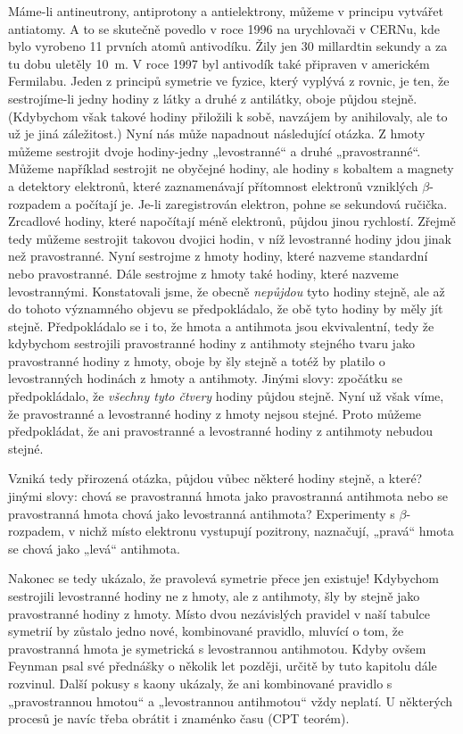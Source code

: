     Máme-li antineutrony, antiprotony a antielektrony, můžeme v principu vytvářet antiatomy.
    A to se skutečně povedlo v roce 1996 na urychlovači v CERNu, kde bylo vyrobeno 11 prvních atomů
    antivodíku. Žily jen 30 millardtin sekundy a za tu dobu uletěly \SI{10}{\m}. V roce 1997 byl
    antivodík také připraven v americkém Fermilabu. Jeden z principů symetrie ve fyzice, který
    vyplývá z rovnic, je ten, že sestrojíme-li jedny hodiny z látky a druhé z antilátky, oboje
    půjdou stejně. (Kdybychom však takové hodiny přiložili k sobě, navzájem by anihilovaly, ale to
    už je jiná záležitost.) Nyní nás může napadnout následující otázka. Z hmoty můžeme sestrojit
    dvoje hodiny-jedny „levostranné“ a druhé „pravostranné“. Můžeme například sestrojit ne obyčejné
    hodiny, ale hodiny s kobaltem a magnety a detektory elektronů, které zaznamenávají přítomnost
    elektronů vzniklých \(\beta\)-rozpadem a počítají je. Je-li zaregistrován elektron, pohne se
    sekundová ručička. Zrcadlové hodiny, které napočítají méně elektronů, půjdou jinou rychlostí.
    Zřejmě tedy můžeme sestrojit takovou dvojici hodin, v níž levostranné hodiny jdou jinak než
    pravostranné. Nyní sestrojme z hmoty hodiny, které nazveme standardní nebo pravostranné. Dále
    sestrojme z hmoty také hodiny, které nazveme levostrannými. Konstatovali jsme, že obecně
    \emph{nepůjdou} tyto hodiny stejně, ale až do tohoto významného objevu se předpokládalo, že obě
    tyto hodiny by měly jít stejně. Předpokládalo se i to, že hmota a antihmota jsou ekvivalentní,
    tedy že kdybychom sestrojili pravostranné hodiny z antihmoty stejného tvaru jako pravostranné
    hodiny z hmoty, oboje by šly stejně a totéž by platilo o levostranných hodinách z hmoty a
    antihmoty. Jinými slovy: zpočátku se předpokládalo, že \emph{všechny tyto čtvery} hodiny půjdou
    stejně. Nyní už však víme, že pravostranné a levostranné hodiny z hmoty nejsou stejné. Proto
    můžeme předpokládat, že ani pravostranné a levostranné hodiny z antihmoty nebudou stejné.

    Vzniká tedy přirozená otázka, půjdou vůbec některé hodiny stejně, a které? jinými slovy: chová
    se pravostranná hmota jako pravostranná antihmota nebo se pravostranná hmota chová jako
    levostranná antihmota? Experimenty s \(\beta\)-rozpadem, v nichž místo elektronu vystupují
    pozitrony, naznačují, „pravá“ hmota se chová jako „levá“ antihmota.

    Nakonec se tedy ukázalo, že pravolevá symetrie přece jen existuje! Kdybychom sestrojili
    levostranné hodiny ne z hmoty, ale z antihmoty, šly by stejně jako pravostranné hodiny z hmoty.
    Místo dvou nezávislých pravidel v naší tabulce symetrií by zůstalo jedno nové, kombinované
    pravidlo, mluvící o tom, že pravostranná hmota je symetrická s levostrannou antihmotou. Kdyby
    ovšem Feynman psal své přednášky o několik let později, určitě by tuto kapitolu dále rozvinul.
    Další pokusy s kaony ukázaly, že ani kombinované pravidlo s „pravostrannou hmotou“ a
    „levostrannou antihmotou“ vždy neplatí. U některých procesů je navíc třeba obrátit i znaménko
    času (CPT teorém). 

